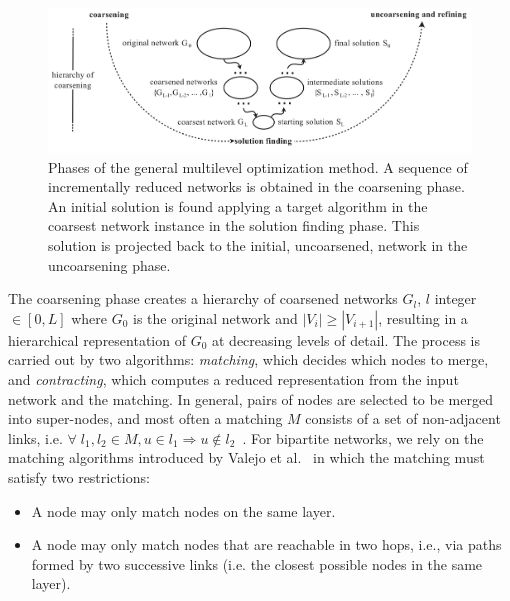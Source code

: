 \documentclass[runningheads]{llncs}
\begin{document}

\begin{figure}\centering
 \includegraphics[width=\textwidth]{mlf}
  \caption{Phases of the general multilevel optimization method.
  A sequence of incrementally reduced networks is obtained in the coarsening phase.
  An initial solution is found applying a target algorithm in the coarsest network instance in the solution finding phase. This solution is projected back to the initial, uncoarsened, network in the uncoarsening phase.
  }\label{mlf}
\end{figure}

\noindent The coarsening phase creates a hierarchy of coarsened networks $G_l$, $l$ integer $ \in [0,L]$ where $G_0$ is the original network and $|V_i| \geq |V_{i+1}|$, resulting in a hierarchical representation of $G_0$ at decreasing levels of detail.
The process is carried out by two algorithms: \emph{matching}, which decides which nodes to merge,
and \emph{contracting}, which computes a reduced representation from the input network and the matching.
In general, pairs of nodes are selected to be merged into super-nodes, and
most often a matching $M$ consists of a set of non-adjacent links,
i.e. $\forall\; l_1, l_2 \in M, u \in l_1 \Rightarrow u \notin l_2$~\cite{co1,co2}.
For bipartite networks, we rely on the matching algorithms introduced by Valejo et al.~\cite{alan2} in which the matching must satisfy two restrictions:

\begin{itemize}
  \item A node may only match nodes on the same layer.
  \item A node may only match nodes that are reachable in two hops, i.e., via paths formed by two successive links    (i.e.  the closest possible nodes in the same layer).
\end{itemize}
\end{document}

